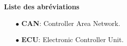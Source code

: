 {\Huge \bf Liste des abr\'eviations} \label{GLOSSAIRE}
\bigskip

\begin{itemize}
\item[$\bullet$] {\bf CAN}: Controller Area Network.
\item[$\bullet$] {\bf ECU}: Electronic Controller Unit.
\end{itemize}



